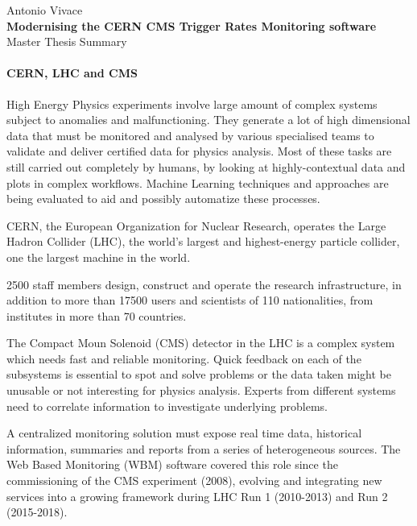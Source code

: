 \documentclass[a4, oneside, 10pt, nobib]{memoir}
\begin{document}
\thispagestyle{empty}

\begin{center}

	{\Large Antonio Vivace}
	\\
	\vspace{8mm}
	{\Huge \textbf{Modernising the CERN CMS Trigger Rates Monitoring software}}
	\\
	\vspace{8mm}
	{\huge Master Thesis Summary}
\end{center}

\pagebreak
\setcounter{page}{1}

		\paragraph{CERN, LHC and CMS} High Energy Physics experiments involve large amount of complex systems subject to anomalies and malfunctioning. They generate a lot of high dimensional data that must be monitored and analysed by various specialised teams to validate and deliver certified data for physics analysis. Most of these tasks are still carried out completely by humans, by looking at highly-contextual data and plots in complex workflows. Machine Learning techniques and approaches are being evaluated to aid and possibly automatize these processes.

		CERN, the European Organization for Nuclear Research, operates the Large Hadron Collider (LHC), the world's largest and highest-energy particle collider, one the largest machine in the world.

		2500 staff members design, construct and operate the research infrastructure, in addition to more than 17500 users and scientists of 110 nationalities, from institutes in more than 70 countries.

		The Compact Moun Solenoid (CMS) detector in the LHC is a complex system which needs fast and reliable monitoring. Quick feedback on each of the subsystems is essential to spot and solve problems or the data taken might be unusable or not interesting for physics analysis. Experts from different systems need to correlate information to investigate underlying problems.

		A centralized monitoring solution must expose real time data, historical information, summaries and reports from a series of heterogeneous sources. The Web Based Monitoring (WBM) software covered this role since the commissioning of the CMS experiment (2008), evolving and integrating new services into a growing framework during LHC Run 1 (2010-2013) and Run 2 (2015-2018).
\end{document}
